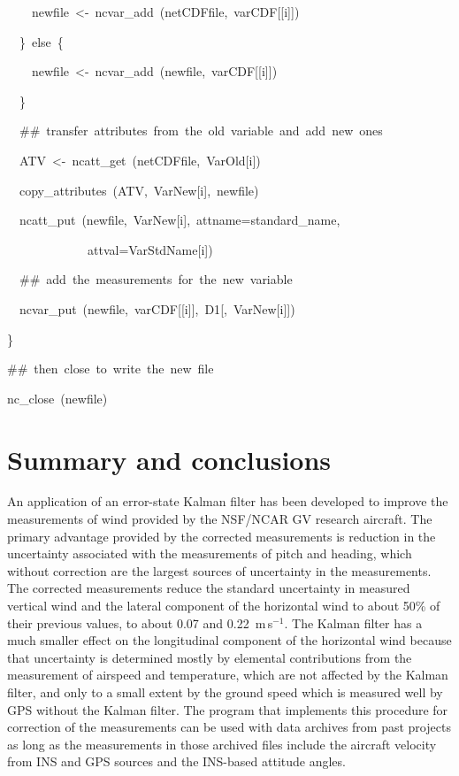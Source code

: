 \documentclass[12pt,twoside,english,12pt,twoside,english]{article}\usepackage[]{graphicx}\usepackage[]{color}
\newenvironment{lyxcode}
{\par\begin{list}{}{
\setlength{\rightmargin}{\leftmargin}
\setlength{\listparindent}{0pt}%
\raggedright
\setlength{\itemsep}{0pt}
\setlength{\parsep}{0pt}
\normalfont\ttfamily}%
 \item[]}
{\end{list}}
\let\stdsection\section
\renewcommand{\section}{\newpage\stdsection}
\let\OrgIndex\index
\renewcommand*{\index}[1]{\OrgIndex{#1}}
\begin{document}
\begin{lyxcode}
{\begin{minipage}[t]{1\columnwidth - 2\fboxsep - 2\fboxrule}
\begin{lyxcode}
~~~~newfile~<-~ncvar\_add~(netCDFfile,~varCDF{[}{[}i{]}{]})

~~\}~else~\{

~~~~newfile~<-~ncvar\_add~(newfile,~varCDF{[}{[}i{]}{]})

~~\}

~~\#\#~transfer~attributes~from~the~old~variable~and~add~new~ones

~~ATV~<-~ncatt\_get~(netCDFfile,~VarOld{[}i{]})

~~copy\_attributes~(ATV,~VarNew{[}i{]},~newfile)

~~ncatt\_put~(newfile,~VarNew{[}i{]},~attname=\textquotedbl{}standard\_name\textquotedbl{},~

~~~~~~~~~~~~~attval=VarStdName{[}i{]})

~~\#\#~add~the~measurements~for~the~new~variable

~~ncvar\_put~(newfile,~varCDF{[}{[}i{]}{]},~D1{[},~VarNew{[}i{]}{]})

\}

\#\#~then~close~to~write~the~new~file

nc\_close~(newfile)
\end{lyxcode}
%
\end{minipage}}
\end{lyxcode}


\section{Summary and conclusions}

An application of an error-state
Kalman filter has been developed
to improve the measurements of wind provided by
the NSF/NCAR GV research aircraft. The
primary advantage provided by the corrected measurements is reduction
in the uncertainty associated with the measurements of pitch and heading,
which without correction are the largest sources of uncertainty in
the measurements. The corrected measurements reduce the standard uncertainty
in measured vertical wind and the lateral component of the horizontal
wind to about 50\% of their previous values, to about 0.07 and 0.22~m\,s$^{-1}$.
The Kalman filter has a much smaller effect on the longitudinal component
of the horizontal wind because that uncertainty is determined mostly
by elemental contributions from the measurement of airspeed and temperature,
which are not affected by the Kalman filter, and only to a small extent
by the ground speed which is measured well by GPS without the Kalman
filter. The program that implements this procedure for correction
of the measurements can be used with data archives from past projects
as long as the measurements in those archived files include the aircraft
velocity from INS and GPS sources and the INS-based attitude angles.
\end{document}
